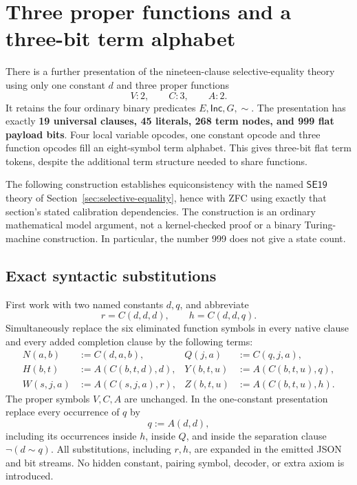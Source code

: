 \section{Three proper functions and a three-bit term alphabet}
\label{sec:three-functions}

There is a further presentation of the nineteen-clause selective-equality
theory using only one constant $d$ and three proper functions
\[
 V:2,\qquad C:3,\qquad A:2.
\]
It retains the four ordinary binary predicates $E,\mathsf{Inc},G,\sim$.
The presentation has exactly \textbf{19 universal clauses, 45 literals,
268 term nodes, and 999 flat payload bits}.  Four local variable opcodes,
one constant opcode and three function opcodes fill an eight-symbol term
alphabet.  This gives three-bit flat term tokens, despite the additional
term structure needed to share functions.

The following construction establishes equiconsistency with the named
$\mathsf{SE19}$ theory of Section~\ref{sec:selective-equality}, hence
with ZFC using exactly that section's stated calibration dependencies.
The construction is an ordinary mathematical model argument, not a
kernel-checked proof or a binary Turing-machine construction.  In
particular, the number 999 does not give a state count.

\subsection{Exact syntactic substitutions}

First work with two named constants $d,q$, and abbreviate
\[
 r=C(d,d,d),\qquad h=C(d,d,q).
\]
Simultaneously replace the six eliminated function symbols in every
native clause and every added completion clause by the following terms:
\begin{align*}
 N(a,b)&:=C(d,a,b),& Q(j,a)&:=C(q,j,a),\\
 H(b,t)&:=A(C(b,t,d),d),&Y(b,t,u)&:=A(C(b,t,u),q),\\
 W(s,j,a)&:=A(C(s,j,a),r),&Z(b,t,u)&:=A(C(b,t,u),h).
\end{align*}
The proper symbols $V,C,A$ are unchanged.  In the one-constant
presentation replace every occurrence of $q$ by
\[
 q:=A(d,d),
\]
including its occurrences inside $h$, inside $Q$, and inside the
separation clause $\neg(d\sim q)$.  All substitutions, including $r,h$,
are expanded in the emitted JSON and bit streams.  No hidden constant,
pairing symbol, decoder, or extra axiom is introduced.

